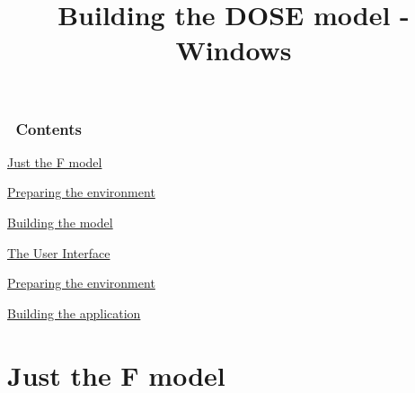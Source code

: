 \documentclass[10pt,a4paper,english]{article}
\title{Building the DOSE model - Windows}
\author{}
\date{}
\newlength{\locallinewidth}
\begin{document}
\maketitle


\setlength{\locallinewidth}{\linewidth}
\hypertarget{contents}{}
\subsubsection*{~\hfill Contents\hfill ~}
\begin{list}{}{}
\item {} \href{\#just-the-f-model}{Just the F model}
\begin{list}{}{}
\item {} \href{\#preparing-the-environment}{Preparing the environment}

\item {} \href{\#building-the-model}{Building the model}

\end{list}

\item {} \href{\#the-user-interface}{The User Interface}
\begin{list}{}{}
\item {} \href{\#id1}{Preparing the environment}

\item {} \href{\#building-the-application}{Building the application}

\end{list}

\end{list}




\hypertarget{just-the-f-model}{}
\section*{Just the F model}



\hypertarget{preparing-the-environment}{}
\end{document}
